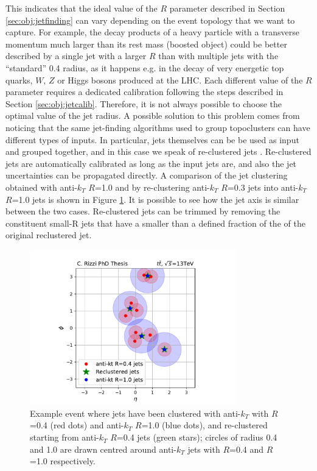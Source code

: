This indicates that the ideal value of the $R$ parameter described in Section \ref{sec:obj:jetfinding} can vary depending on the event topology that we want to capture. 
For example, the decay products of a heavy particle with a transverse momentum much larger than its rest mass (boosted object) could be better described by a 
single jet with a larger $R$ than with multiple jets with the ``standard'' 0.4 radius, 
as it happens e.g. in the decay of very energetic top quarks, $W$, $Z$ or Higgs bosons produced at the LHC.
Each different value of the $R$ parameter requires a dedicated calibration following the steps described in Section \ref{sec:obj:jetcalib}. 
Therefore, it is not always possible to choose the optimal value of the jet radius. 
A possible solution to this problem comes from noticing that the same jet-finding algorithms used to group topoclusters can have different types of inputs. 
In particular, jets themselves can be be used as input and grouped together, and in this case we speak of re-clustered jets \cite{Nachman:2014kla}. 
Re-clustered jets are automatically calibrated as long as the input jets are, and also the jet uncertainties can be propagated directly. 
A comparison of the jet clustering obtained with anti-$k_T$ $R$=1.0 and by re-clustering anti-$k_T$ $R$=0.3 jets into anti-$k_T$ $R$=1.0 jets 
is shown in Figure \ref{fig:recluster}. It is possible to see how the jet axis is similar between the two cases. 
Re-clustered jets can be trimmed by removing the constituent small-R jets that have a \pt smaller than a defined fraction of the \pt of the original reclustered jet. 


\begin{figure}[h]
\begin{center}
\includegraphics[width=0.8\textwidth]{figures/Chap5/Rizzi-Fig5-4.pdf}
\end{center}
\caption{Example event where jets have been clustered with anti-$k_T$ with $R$=0.4 (red dots) and anti-$k_T$ $R$=1.0 (blue dots), and re-clustered starting from anti-$k_T$ $R$=0.4 jets (green stars); 
circles of radius 0.4 and 1.0 are drawn centred around anti-$k_T$ jets with $R$=0.4 and $R$=1.0 respectively. }
\label{fig:recluster}
\end{figure}


